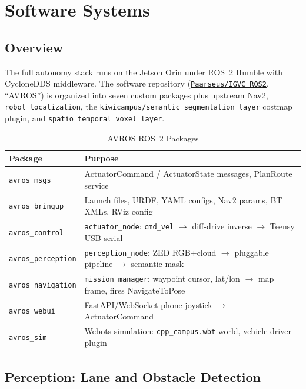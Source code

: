 \documentclass[11pt, letterpaper]{article}
\begin{document}
\section{Software Systems}
\label{sec:software}

\subsection{Overview}

The full autonomy stack runs on the Jetson Orin under ROS~2 Humble with CycloneDDS
middleware. The software repository (\href{https://github.com/Paarseus/IGVC_ROS2}
{\texttt{Paarseus/IGVC\_ROS2}}, ``AVROS'') is organized into seven custom packages plus
upstream Nav2, \texttt{robot\_localization}, the \texttt{kiwicampus/semantic\_segmentation\_layer}
costmap plugin, and \texttt{spatio\_temporal\_voxel\_layer}.

\begin{table}[H]
    \centering
    \small
    \caption{AVROS ROS~2 Packages}
    \begin{tabularx}{\textwidth}{l X}
        \toprule
        \textbf{Package} & \textbf{Purpose} \\
        \midrule
        \texttt{avros\_msgs} & ActuatorCommand / ActuatorState messages, PlanRoute service \\
        \texttt{avros\_bringup} & Launch files, URDF, YAML configs, Nav2 params, BT XMLs, RViz config \\
        \texttt{avros\_control} & \texttt{actuator\_node}: \texttt{cmd\_vel} $\to$ diff-drive inverse $\to$ Teensy USB serial \\
        \texttt{avros\_perception} & \texttt{perception\_node}: ZED RGB+cloud $\to$ pluggable pipeline $\to$ semantic mask \\
        \texttt{avros\_navigation} & \texttt{mission\_manager}: waypoint cursor, lat/lon $\to$ map frame, fires NavigateToPose \\
        \texttt{avros\_webui} & FastAPI/WebSocket phone joystick $\to$ ActuatorCommand \\
        \texttt{avros\_sim} & Webots simulation: \texttt{cpp\_campus.wbt} world, vehicle driver plugin \\
        \bottomrule
    \end{tabularx}
\end{table}

\subsection{Perception: Lane and Obstacle Detection}
\end{document}
